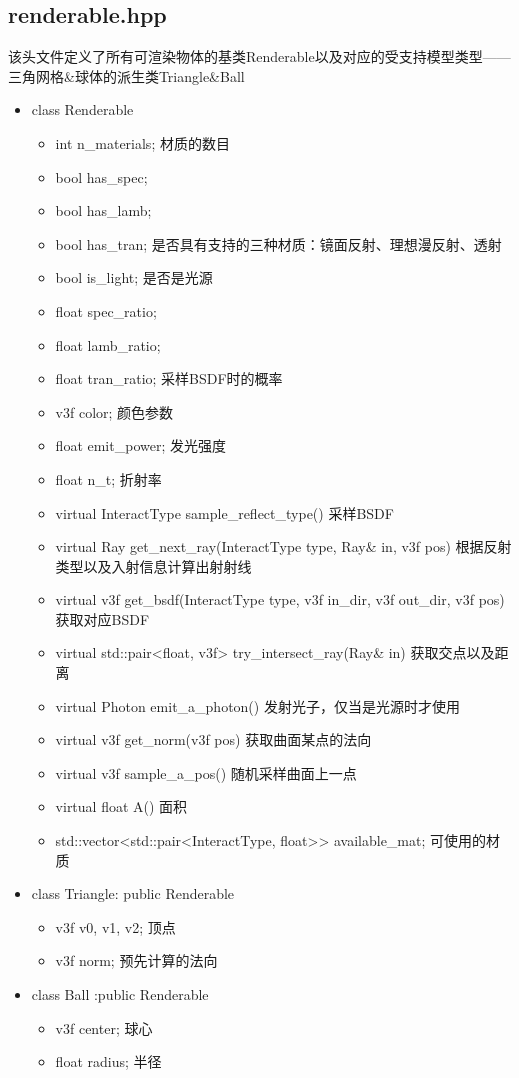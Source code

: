 \documentclass[12pt]{article}
\begin{document}
\subsection{renderable.hpp}
该头文件定义了所有可渲染物体的基类Renderable以及对应的受支持模型类型——三角网格\&球体的派生类Triangle\&Ball
\begin{itemize}
    \item class Renderable
    \begin{itemize}
        \item int n\_materials; 材质的数目
        \item bool has\_spec;
        \item bool has\_lamb;
        \item bool has\_tran; 是否具有支持的三种材质：镜面反射、理想漫反射、透射
        \item bool is\_light; 是否是光源
        \item float spec\_ratio;
        \item float lamb\_ratio;
        \item float tran\_ratio; 采样BSDF时的概率
        \item v3f color; 颜色参数
        \item float emit\_power; 发光强度
        \item float n\_t; 折射率
        \item virtual InteractType sample\_reflect\_type() 采样BSDF
        \item virtual Ray get\_next\_ray(InteractType type,  Ray\& in, v3f pos) 根据反射类型以及入射信息计算出射射线
        \item virtual v3f get\_bsdf(InteractType type, v3f in\_dir, v3f out\_dir, v3f pos) 获取对应BSDF
        \item virtual std::pair<float, v3f> try\_intersect\_ray(Ray\& in) 获取交点以及距离
        \item virtual Photon emit\_a\_photon() 发射光子，仅当是光源时才使用
        \item virtual v3f get\_norm(v3f pos) 获取曲面某点的法向
        \item virtual v3f sample\_a\_pos() 随机采样曲面上一点
        \item virtual float A() 面积
        \item std::vector<std::pair<InteractType, float>> available\_mat; 可使用的材质
    \end{itemize}
    \item class Triangle: public Renderable
    \begin{itemize}
        \item v3f v0, v1, v2; 顶点
        \item v3f norm; 预先计算的法向
    \end{itemize}
    \item class Ball :public Renderable
    \begin{itemize}
        \item v3f center; 球心
        \item float radius; 半径
    \end{itemize}
\end{itemize}
\end{document}
